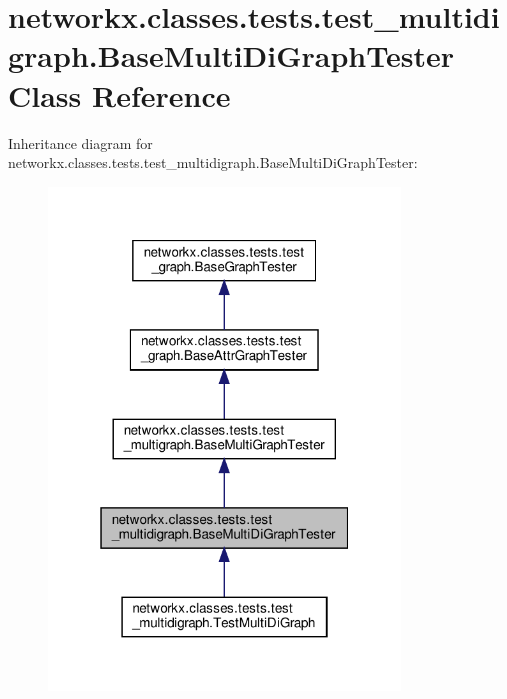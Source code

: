 \hypertarget{classnetworkx_1_1classes_1_1tests_1_1test__multidigraph_1_1BaseMultiDiGraphTester}{}\section{networkx.\+classes.\+tests.\+test\+\_\+multidigraph.\+Base\+Multi\+Di\+Graph\+Tester Class Reference}
\label{classnetworkx_1_1classes_1_1tests_1_1test__multidigraph_1_1BaseMultiDiGraphTester}


Inheritance diagram for networkx.\+classes.\+tests.\+test\+\_\+multidigraph.\+Base\+Multi\+Di\+Graph\+Tester\+:
\nopagebreak
\begin{figure}[H]
\begin{center}
\leavevmode
\includegraphics[width=265pt]{classnetworkx_1_1classes_1_1tests_1_1test__multidigraph_1_1BaseMultiDiGraphTester__inherit__graph}
\end{center}
\end{figure}


